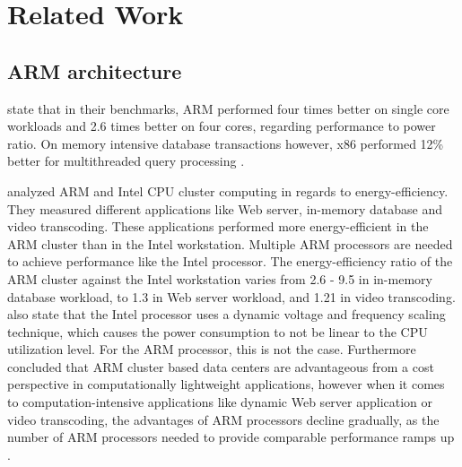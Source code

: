 \section{Related Work}

\subsection{ARM architecture}

\citeauthor{maqbool2015evaluating} 
state that in their benchmarks,
ARM performed four times better on single core workloads and
2.6 times better on four cores, 
regarding performance to power ratio.
On memory intensive database transactions however, 
x86 performed 12\% better for multithreaded query processing
\cite{maqbool2015evaluating}.

\citeauthor{ou2012energy} analyzed ARM and Intel CPU cluster computing 
in regards to energy-efficiency. They measured different applications
like Web server, in-memory database and video transcoding. These
applications performed more energy-efficient in the ARM cluster than 
in the Intel workstation. Multiple ARM processors are needed to 
achieve performance like the Intel processor. 
The energy-efficiency ratio of the
ARM cluster against the Intel workstation varies from 2.6 - 9.5 in
in-memory database workload, to 1.3 in Web server workload, and 
1.21 in video transcoding. 
\citeauthor{ou2012energy} also state that the Intel processor
uses a dynamic voltage and frequency scaling technique, which 
causes the power consumption to not be linear to the CPU utilization level.
For the ARM processor, this is not the case.
Furthermore \citeauthor{ou2012energy} concluded that ARM cluster 
based data centers are advantageous from a cost perspective
in computationally lightweight applications,
however when it comes to computation-intensive applications
like dynamic Web server application or video transcoding, the advantages
of ARM processors decline gradually, as the number of ARM processors needed 
to provide comparable performance ramps up
\cite{ou2012energy}.